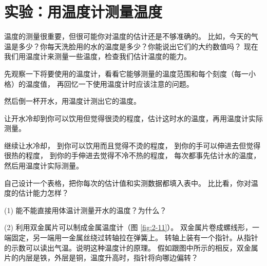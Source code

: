 \section{实验：用温度计测量温度}\label{sec:2-4}

温度的测量很重要，但很可能你对温度的估计还是不够准确的。
比如，今天的气温是多少？你每天洗脸用的水的温度是多少？你能说出它们的大约数值吗？
现在我们用温度计来测量一些温度，检查我们估计温度的能力。

先观察一下将要使用的温度计，看看它能够测量的温度范围和每个刻度（每一小格）的温度值，
再回忆一下使用温度计时应该注意的问题。

然后倒一杯开水，用温度计测出它的温度。

让开水冷却到你可以饮用但觉得很烫的程度，估计这时水的温度，再用温度计实际测量。

继续让水冷却，
到你可以饮用而且觉得不烫的程度，
到你的手可以伸进去但觉得很热的程度，
到你的手伸进去觉得不冷不热的程度，
每次都事先估计水的温度，然后用温度计实际测量。

自己设计一个表格，把你每次的估计值和实测数据都填入表中。
比比看，你对温度的估计能力怎样？


\lianxi

(1) 能不能直接用体温计测量开水的温度？为什么？

(2) 利用双金属片可以制成金属温度计（图 \ref{fig:2-11}）。
双金属片卷成螺线形，一端固定，另一端用一金属丝绕过转轴拉在弹簧上。
转轴上装有一个指针。从指针的示数可以读出气温。说明这种温度计的原理。
假如跟图中所示的相反，双金属片的内层是铁，外层是铜，温度升高时，指针将向哪边偏转？

